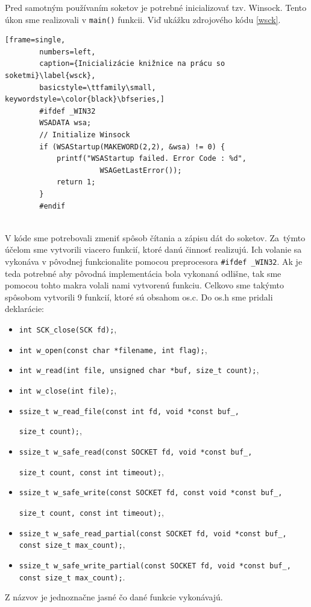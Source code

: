 Pred samotným používaním soketov je potrebné inicializovať tzv. Winsock. Tento úkon sme realizovali v \lstinline|main()| funkcii. Viď ukážku zdrojového kódu \ref{wsck}.

\begin{minipage}{\linewidth} 	
	\begin{lstlisting}[frame=single,
		numbers=left,
		caption={Inicializácie knižnice na prácu so soketmi}\label{wsck},
		basicstyle=\ttfamily\small, keywordstyle=\color{black}\bfseries,]
		#ifdef _WIN32
		WSADATA wsa;
		// Initialize Winsock
		if (WSAStartup(MAKEWORD(2,2), &wsa) != 0) {
			printf("WSAStartup failed. Error Code : %d",
				      WSAGetLastError());
			return 1;
		}
		#endif
	\end{lstlisting}
\end{minipage}\\

V kóde sme potrebovali zmeniť spôsob čítania a zápisu dát do soketov. Za~týmto účelom sme vytvorili viacero funkcií, ktoré danú činnosť realizujú. Ich volanie sa vykonáva v pôvodnej funkcionalite pomocou preprocesora \lstinline|#ifdef _WIN32|. Ak je teda potrebné aby pôvodná implementácia bola vykonaná odlišne, tak sme pomocou tohto makra volali nami vytvorenú funkciu. Celkovo sme takýmto spôsobom vytvorili 9 funkcií, ktoré sú obsahom os.c. Do os.h sme pridali deklarácie:
\begin{itemize}
	\item\lstinline|int SCK_close(SCK fd);|,
	\item\lstinline|int w_open(const char *filename, int flag);|,
	\item\lstinline|int w_read(int file, unsigned char *buf, size_t count);|,
	\item\lstinline|int w_close(int file);|,
	\item\lstinline|ssize_t w_read_file(const int fd, void *const buf_,|
	 
					\lstinline|size_t count);|,
	\item\lstinline|ssize_t w_safe_read(const SOCKET fd, void *const buf_, | 
	
					\lstinline|size_t count, const int timeout);|,
	\item\lstinline|ssize_t w_safe_write(const SOCKET fd, const void *const buf_, |
	
					\lstinline|size_t count, const int timeout);|,
	\item\lstinline|ssize_t w_safe_read_partial(const SOCKET fd, void *const buf_, |
					\lstinline|const size_t max_count);|,
	\item\lstinline|ssize_t w_safe_write_partial(const SOCKET fd, void *const buf_,| 
					\lstinline|const size_t max_count);|.
\end{itemize}  
Z názvov je jednoznačne jasné čo dané funkcie vykonávajú.

